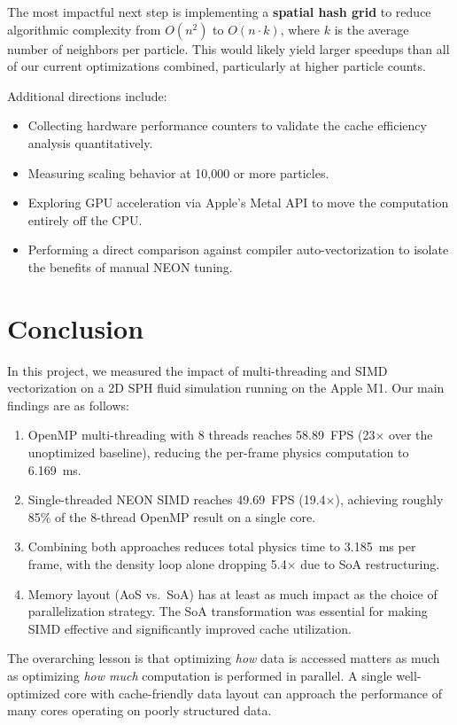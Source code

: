 \documentclass[12pt, a4paper]{article}
\begin{document}
The most impactful next step is implementing a \textbf{spatial hash grid} to reduce algorithmic complexity from $O(n^2)$ to $O(n \cdot k)$, where $k$ is the average number of neighbors per particle. This would likely yield larger speedups than all of our current optimizations combined, particularly at higher particle counts.

Additional directions include:
\begin{itemize}
    \item Collecting hardware performance counters to validate the cache efficiency analysis quantitatively.
    \item Measuring scaling behavior at 10,000 or more particles.
    \item Exploring GPU acceleration via Apple's Metal API to move the computation entirely off the CPU.
    \item Performing a direct comparison against compiler auto-vectorization to isolate the benefits of manual NEON tuning.
\end{itemize}

\section{Conclusion}

In this project, we measured the impact of multi-threading and SIMD vectorization on a 2D SPH fluid simulation running on the Apple M1. Our main findings are as follows:

\begin{enumerate}
    \item OpenMP multi-threading with 8 threads reaches 58.89~FPS (23$\times$ over the unoptimized baseline), reducing the per-frame physics computation to 6.169~ms.
    \item Single-threaded NEON SIMD reaches 49.69~FPS (19.4$\times$), achieving roughly 85\% of the 8-thread OpenMP result on a single core.
    \item Combining both approaches reduces total physics time to 3.185~ms per frame, with the density loop alone dropping 5.4$\times$ due to SoA restructuring.
    \item Memory layout (AoS vs.\ SoA) has at least as much impact as the choice of parallelization strategy. The SoA transformation was essential for making SIMD effective and significantly improved cache utilization.
\end{enumerate}

The overarching lesson is that optimizing \emph{how} data is accessed matters as much as optimizing \emph{how much} computation is performed in parallel. A single well-optimized core with cache-friendly data layout can approach the performance of many cores operating on poorly structured data.



\end{document}
